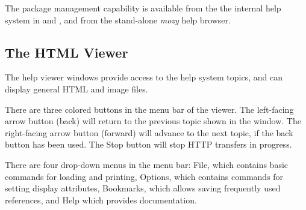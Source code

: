 The {\XicTools} package management capability is available from
the the internal help system in {\Xic} and {\WRspice}, and
    from the stand-alone {\it mozy} help browser.

\subsection{The HTML Viewer}
\label{helpview}

The help viewer windows provide access to the help system topics, and
can display general HTML and image files.

There are three colored buttons in the menu bar of the viewer.  The
left-facing arrow button (back) will return to the previous topic
shown in the window.  The right-facing arrow button (forward) will
advance to the next topic, if the back button has been used.  The {\cb
Stop} button will stop HTTP transfers in progress.

There are four drop-down menus in the menu bar:  {\cb File}, which
contains basic commands for loading and printing, {\cb Options}, which
contains commands for setting display attributes, {\cb Bookmarks},
which allows saving frequently used references, and {\cb Help} which
provides documentation.

